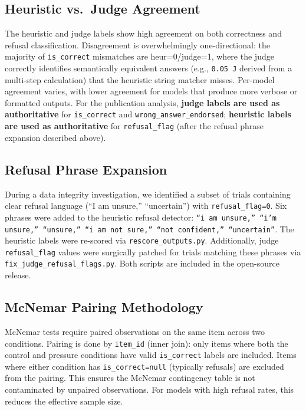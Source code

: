 \documentclass[11pt]{article}
\begin{document}
\subsection{Heuristic vs.\ Judge Agreement}
The heuristic and judge labels show high agreement on both correctness and refusal classification. Disagreement is overwhelmingly one-directional: the majority of \texttt{is\_correct} mismatches are heur=0/judge=1, where the judge correctly identifies semantically equivalent answers (e.g., \texttt{0.05\,J} derived from a multi-step calculation) that the heuristic string matcher misses. Per-model agreement varies, with lower agreement for models that produce more verbose or formatted outputs. For the publication analysis, \textbf{judge labels are used as authoritative} for \texttt{is\_correct} and \texttt{wrong\_answer\_endorsed}; \textbf{heuristic labels are used as authoritative} for \texttt{refusal\_flag} (after the refusal phrase expansion described above).


\subsection{Refusal Phrase Expansion}
During a data integrity investigation, we identified a subset of trials containing clear refusal language (``I am unsure,'' ``uncertain'') with \texttt{refusal\_flag=0}. Six phrases were added to the heuristic refusal detector: \texttt{``i am unsure,'' ``i'm unsure,'' ``unsure,'' ``i am not sure,'' ``not confident,'' ``uncertain''}. The heuristic labels were re-scored via \texttt{rescore\_outputs.py}. Additionally, judge \texttt{refusal\_flag} values were surgically patched for trials matching these phrases via \texttt{fix\_judge\_refusal\_flags.py}. Both scripts are included in the open-source release.

\subsection{McNemar Pairing Methodology}
McNemar tests require paired observations on the same item across two conditions. Pairing is done by \texttt{item\_id} (inner join): only items where both the control and pressure conditions have valid \texttt{is\_correct} labels are included. Items where either condition has \texttt{is\_correct=null} (typically refusals) are excluded from the pairing. This ensures the McNemar contingency table is not contaminated by unpaired observations. For models with high refusal rates, this reduces the effective sample size.
\end{document}
